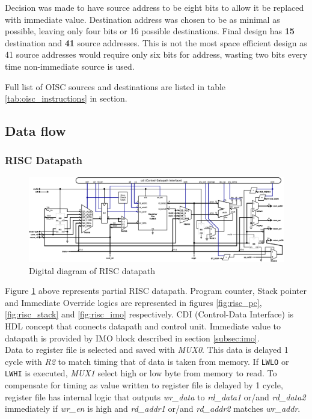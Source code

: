 Decision was made to have source address to be eight bits to allow it be replaced with immediate value. Destination address was chosen to be as minimal as possible, leaving only four bits or 16 possible destinations. Final design has \textbf{15} destination and \textbf{41} source addresses. This is not the most space efficient design as 41 source addresses would require only six bits for address, wasting two bits every time non-immediate source is used.

Full list of OISC sources and destinations are listed in table \ref{tab:oisc_instructions} in  section.

\begin{landscape}
	\subsection{Data flow} \label{sec:dataflow}
	\subsubsection{RISC Datapath} \label{subsec:datapath}
	\begin{figure}[h!]
		\centering
		\includegraphics[width=\linewidth]{../resources/datapath.eps}
		\caption{Digital diagram of RISC datapath}
		\label{fig:datapath}	
	\end{figure}
	
	Figure \ref{fig:datapath} above represents partial RISC datapath. Program counter, Stack pointer and Immediate Override logics are represented in figures \ref{fig:risc_pc}, \ref{fig:risc_stack} and \ref{fig:risc_imo} respectively. CDI (Control-Data Interface) is HDL concept that connects datapath and control unit. Immediate value to datapath is provided by IMO block described in section \ref{subsec:imo}.\\
	Data to register file is selected and saved with \textit{MUX0}. This data is delayed 1 cycle with \textit{R2} to match timing that of data is taken from memory. If \texttt{LWLO} or \texttt{LWHI} is executed, \textit{MUX1} select high or low byte from memory to read. To compensate for timing as value written to register file is delayed by 1 cycle, register file has internal logic that outputs \textit{wr\_data} to \textit{rd\_data1} or/and  \textit{rd\_data2} immediately if \textit{wr\_en} is high and \textit{rd\_addr1} or/and \textit{rd\_addr2} matches \textit{wr\_addr}.\\
\end{landscape}


